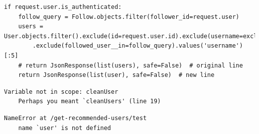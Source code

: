\begin{lstlisting}[caption={Django Code Change},label={code:djangoTest2LC}]
	if request.user.is_authenticated:
	follow_query = Follow.objects.filter(follower_id=request.user)
	users = User.objects.filter().exclude(id=request.user.id).exclude(username=excluded_username)\
		.exclude(followed_user__in=follow_query).values('username')[:5]
	# return JsonResponse(list(users), safe=False)  # original line
	return JsonResponse(list(user), safe=False)  # new line
\end{lstlisting}

\begin{lstlisting}[caption={Yesod Exception Message},label={code:yesodTest2Exception}]
	Variable not in scope: cleanUser
	Perhaps you meant `cleanUsers' (line 19)
\end{lstlisting}

\begin{lstlisting}[caption={Django Exception Message},label={code:djangoTest2Exception}]
	NameError at /get-recommended-users/test
	name `user' is not defined
\end{lstlisting}
